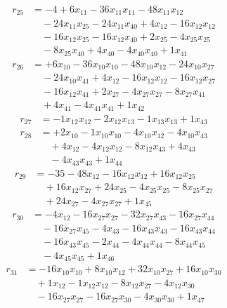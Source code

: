 \[\begin{aligned}
r_{25} &= - 4 + 6 x_{11} - 36 x_{11} x_{11} - 48 x_{11} x_{12} \\
 &\quad - 24 x_{11} x_{25} - 24 x_{11} x_{40} + 4 x_{12} - 16 x_{12} x_{12} \\
 &\quad - 16 x_{12} x_{25} - 16 x_{12} x_{40} + 2 x_{25} - 4 x_{25} x_{25} \\
 &\quad - 8 x_{25} x_{40} + 4 x_{40} - 4 x_{40} x_{40} + 1 x_{41}
\end{aligned}\]
\[\begin{aligned}
r_{26} &= + 6 x_{10} - 36 x_{10} x_{10} - 48 x_{10} x_{12} - 24 x_{10} x_{27} \\
 &\quad - 24 x_{10} x_{41} + 4 x_{12} - 16 x_{12} x_{12} - 16 x_{12} x_{27} \\
 &\quad - 16 x_{12} x_{41} + 2 x_{27} - 4 x_{27} x_{27} - 8 x_{27} x_{41} \\
 &\quad + 4 x_{41} - 4 x_{41} x_{41} + 1 x_{42}
\end{aligned}\]
\[\begin{aligned}
r_{27} &= - 1 x_{12} x_{12} - 2 x_{12} x_{13} - 1 x_{13} x_{13} + 1 x_{43}
\end{aligned}\]
\[\begin{aligned}
r_{28} &= + 2 x_{10} - 1 x_{10} x_{10} - 4 x_{10} x_{12} - 4 x_{10} x_{43} \\
 &\quad + 4 x_{12} - 4 x_{12} x_{12} - 8 x_{12} x_{43} + 4 x_{43} \\
 &\quad - 4 x_{43} x_{43} + 1 x_{44}
\end{aligned}\]
\[\begin{aligned}
r_{29} &= - 35 - 48 x_{12} - 16 x_{12} x_{12} + 16 x_{12} x_{25} \\
 &\quad + 16 x_{12} x_{27} + 24 x_{25} - 4 x_{25} x_{25} - 8 x_{25} x_{27} \\
 &\quad + 24 x_{27} - 4 x_{27} x_{27} + 1 x_{45}
\end{aligned}\]
\[\begin{aligned}
r_{30} &= - 4 x_{12} - 16 x_{27} x_{27} - 32 x_{27} x_{43} - 16 x_{27} x_{44} \\
 &\quad - 16 x_{27} x_{45} - 4 x_{43} - 16 x_{43} x_{43} - 16 x_{43} x_{44} \\
 &\quad - 16 x_{43} x_{45} - 2 x_{44} - 4 x_{44} x_{44} - 8 x_{44} x_{45} \\
 &\quad - 4 x_{45} x_{45} + 1 x_{46}
\end{aligned}\]
\[\begin{aligned}
r_{31} &= - 16 x_{10} x_{10} + 8 x_{10} x_{12} + 32 x_{10} x_{27} + 16 x_{10} x_{30} \\
 &\quad + 1 x_{12} - 1 x_{12} x_{12} - 8 x_{12} x_{27} - 4 x_{12} x_{30} \\
 &\quad - 16 x_{27} x_{27} - 16 x_{27} x_{30} - 4 x_{30} x_{30} + 1 x_{47}
\end{aligned}\]

